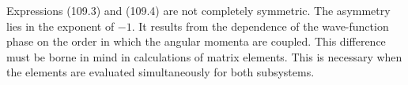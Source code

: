 Expressions (109.3) and (109.4) are not completely symmetric.
The asymmetry lies in the exponent of $-1$.
It results from the dependence of the wave-function phase on the order in which the angular momenta are coupled.
This difference must be borne in mind in calculations of matrix elements.
This is necessary when the elements are evaluated simultaneously for both subsystems.
